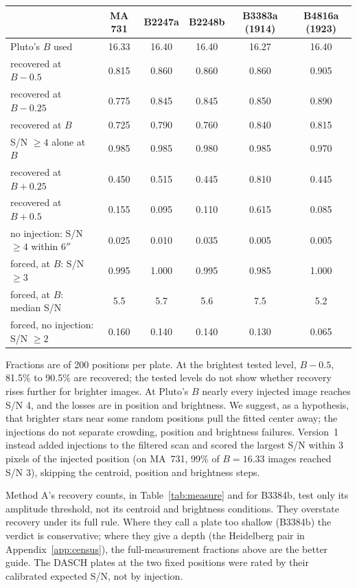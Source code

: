 \documentclass[11pt]{article}
\begin{document}
\begin{appendices}
\begin{center}
\footnotesize
\begin{tabular}{@{}lccccc@{}}
\toprule
 & MA 731 & B2247a & B2248b & B3383a (1914) & B4816a (1923) \\
\midrule
Pluto's $B$ used & 16.33 & 16.40 & 16.40 & 16.27 & 16.40 \\
recovered at $B-0.5$ & 0.815 & 0.860 & 0.860 & 0.860 & 0.905 \\
recovered at $B-0.25$ & 0.775 & 0.845 & 0.845 & 0.850 & 0.890 \\
recovered at $B$ & 0.725 & 0.790 & 0.760 & 0.840 & 0.815 \\
\quad S/N $\ge4$ alone at $B$ & 0.985 & 0.985 & 0.980 & 0.985 & 0.970 \\
recovered at $B+0.25$ & 0.450 & 0.515 & 0.445 & 0.810 & 0.445 \\
recovered at $B+0.5$ & 0.155 & 0.095 & 0.110 & 0.615 & 0.085 \\
no injection: S/N $\ge4$ within $6''$ & 0.025 & 0.010 & 0.035 & 0.005 & 0.005 \\
\midrule
forced, at $B$: S/N $\ge3$ & 0.995 & 1.000 & 0.995 & 0.985 & 1.000 \\
forced, at $B$: median S/N & 5.5 & 5.7 & 5.6 & 7.5 & 5.2 \\
forced, no injection: S/N $\ge2$ & 0.160 & 0.140 & 0.140 & 0.130 & 0.065 \\
\bottomrule
\end{tabular}
\end{center}
Fractions are of 200 positions per plate. At the brightest tested level, $B-0.5$, 81.5\% to 90.5\% are recovered; the tested levels do not show whether recovery rises further for brighter images. At Pluto's $B$ nearly every injected image reaches S/N 4, and the losses are in position and brightness. We suggest, as a hypothesis, that brighter stars near some random positions pull the fitted center away; the injections do not separate crowding, position and brightness failures. Version~1 instead added injections to the filtered scan and scored the largest S/N within 3 pixels of the injected position (on MA~731, 99\% of $B=16.33$ images reached S/N 3), skipping the centroid, position and brightness steps.

Method A's recovery counts, in Table~\ref{tab:measure} and for B3384b, test only its amplitude threshold, not its centroid and brightness conditions. They overstate recovery under its full rule. Where they call a plate too shallow (B3384b) the verdict is conservative; where they give a depth (the Heidelberg pair in Appendix~\ref{app:census}), the full-measurement fractions above are the better guide. The DASCH plates at the two fixed positions were rated by their calibrated expected S/N, not by injection.


\end{appendices}
\end{document}
